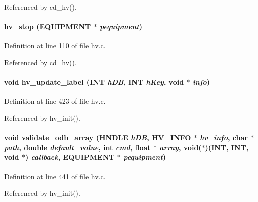 Referenced by cd\_\-hv().
\paragraph[{hv\_\-stop}]{ hv\_\-stop ({\bf EQUIPMENT} $\ast$ {\em pequipment})}\hfill\label{hv_8c_a436026ab3058e095a1c65188b29106a4}


Definition at line 110 of file hv.c.

Referenced by cd\_\-hv().
\paragraph[{hv\_\-update\_\-label}]{\setlength{\rightskip}{0pt plus 5cm}void hv\_\-update\_\-label ({\bf INT} {\em hDB}, \/  {\bf INT} {\em hKey}, \/  void $\ast$ {\em info})}\hfill\label{hv_8c_a3d7aa8fc312aea3251456ed55b47ae56}


Definition at line 423 of file hv.c.

Referenced by hv\_\-init().
\paragraph[{validate\_\-odb\_\-array}]{\setlength{\rightskip}{0pt plus 5cm}void validate\_\-odb\_\-array (HNDLE {\em hDB}, \/  {\bf HV\_\-INFO} $\ast$ {\em hv\_\-info}, \/  char $\ast$ {\em path}, \/  double {\em default\_\-value}, \/  int {\em cmd}, \/  float $\ast$ {\em array}, \/  void($\ast$)({\bf INT}, {\bf INT}, void $\ast$) {\em callback}, \/  {\bf EQUIPMENT} $\ast$ {\em pequipment})}\hfill\label{hv_8c_ac42d4bdc1a509e87ead709972da88ea9}


Definition at line 441 of file hv.c.

Referenced by hv\_\-init().
